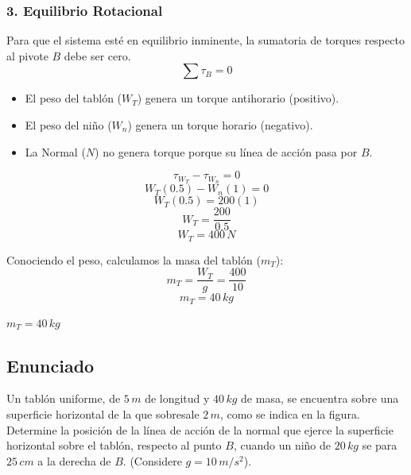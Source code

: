 \documentclass[12pt, a4paper]{article}
\begin{document}
\subsubsection*{3. Equilibrio Rotacional}
Para que el sistema esté en equilibrio inminente, la sumatoria de torques respecto al pivote $B$ debe ser cero. 
$$\sum \tau_B = 0$$

\begin{itemize}
    \item El peso del tablón ($W_T$) genera un torque antihorario (positivo).
    \item El peso del niño ($W_n$) genera un torque horario (negativo).
    \item La Normal ($N$) no genera torque porque su línea de acción pasa por $B$.
\end{itemize}

$$\tau_{W_T} - \tau_{W_n} = 0$$
$$W_T (0.5) - W_n (1) = 0$$
$$W_T (0.5) = 200(1)$$
$$W_T = \frac{200}{0.5}$$
$$W_T = 400 \, \si{N}$$

Conociendo el peso, calculamos la masa del tablón ($m_T$):
$$m_T = \frac{W_T}{g} = \frac{400}{10}$$
$$m_T = 40 \, \si{kg}$$

\begin{tcolorbox}[colback=green!5!white, colframe=green!50!black, title=Respuesta Final]
\centering \Large $m_T = 40 \, \si{kg}$
\end{tcolorbox}

\newpage

\subsection*{Enunciado}
Un tablón uniforme, de $5 \, \si{m}$ de longitud y $40 \, \si{kg}$ de masa, se encuentra sobre una superficie horizontal de la que sobresale $2 \, \si{m}$, como se indica en la figura. Determine la posición de la línea de acción de la normal que ejerce la superficie horizontal sobre el tablón, respecto al punto $B$, cuando un niño de $20 \, \si{kg}$ se para $25 \, \si{cm}$ a la derecha de $B$. (Considere $g=10\,\si{m/s^2}$).

\begin{center}
\end{center}
\end{document}

